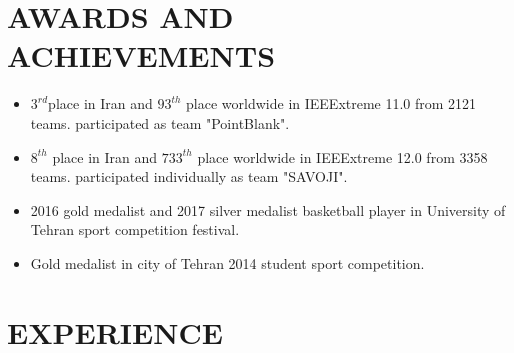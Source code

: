 \documentclass[11pt,a4paper,roman]{moderncv}        %
\begin{document}
\section{AWARDS AND ACHIEVEMENTS}
\begin{minipage}{\maincolumnwidth}%
	\small{
		\begin{itemize}
			\item $3^{rd}$place in Iran and $93^{th}$ place worldwide in IEEExtreme 11.0 from 2121 teams. participated as team "PointBlank".
			\item $8^{th}$ place in Iran and $733^{th}$ place worldwide in IEEExtreme 12.0 from 3358 teams. participated individually as team "SAVOJI". 
			\item 2016 gold medalist and 2017 silver medalist basketball player in University of Tehran sport competition festival.
			\item Gold medalist in city of Tehran 2014 student sport competition.
	\end{itemize}}%
\end{minipage}%

\section{EXPERIENCE}
\end{document}
